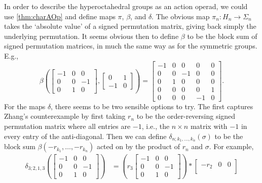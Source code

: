 \begin{example}
In order to describe the hyperoctahedral groups as an action operad, we could use \cref{thm:charAOp} and define maps $\pi$, $\beta$, and $\delta$. The obvious map $\pi_n \colon H_n \rightarrow \Sigma_n$ takes the `absolute value' of a signed permutation matrix, giving back simply the underlying permutation. It seems obvious then to define $\beta$ to be the block sum of signed permutation matrices, in much the same way as for the symmetric groups. E.g.,
  \[
    \beta\left(
      \begin{bmatrix}
      -1 & 0 & 0 \\
      0 & 0 & -1 \\
      0 & 1 & 0
      \end{bmatrix},
      \begin{bmatrix}
      0 & 1 \\
      -1 & 0
      \end{bmatrix}
    \right)
    =
    \begin{bmatrix}
      -1 &  0 &  0 &  0 & 0 \\
      0  &  0 & -1 &  0 & 0 \\
      0  &  1 &  0 &  0 & 0 \\
      0  &  0 &  0 &  0 & 1 \\
      0  &  0 &  0 & -1 & 0
    \end{bmatrix}.
  \]
For the maps $\delta$, there seems to be two sensible options to try. The first captures Zhang's counterexample by first taking $r_n$ to be the order-reversing signed permutation matrix where all entries are $-1$, i.e., the $n \times n$ matrix with $-1$ in every entry of the anti-diagonal. Then we can define $\delta_{n;k_1,\ldots,k_n}(\sigma)$ to be the block sum $\beta(-r_{k_1},\ldots,-r_{k_n})$ acted on by the product of $r_n$ and $\sigma$. For example,
  \begin{align*}
    \delta_{3;2,1,3}\left(
    \begin{bmatrix}
      -1 & 0 & 0 \\
      0 & 0 & -1 \\
      0 & 1 & 0
      \end{bmatrix}
      \right)
      &=
      \left(
      r_3
      \begin{bmatrix}
      -1 & 0 & 0 \\
      0 & 0 & -1 \\
      0 & 1 & 0
      \end{bmatrix}
      \right)
      \ast
      \begin{bmatrix}
      -r_2 & 0 & 0 \\

\end{bmatrix}
\end{align*}
\end{example}
